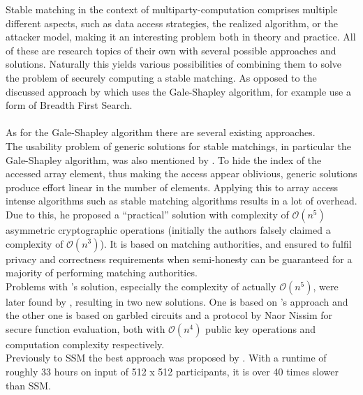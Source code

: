 Stable matching in the context of multiparty-computation comprises multiple different aspects, such as data access strategies, the realized algorithm, or the attacker model, making it an interesting problem both in theory and practice. All of these are research topics of their own with several possible approaches and solutions. Naturally this yields various possibilities of combining them to solve the problem of securely computing a stable matching. As opposed to the discussed approach by \citet{smas} which uses the Gale-Shapley algorithm, \citet{dogafscao} for example use a form of Breadth First Search.\\
\ \\As for the Gale-Shapley algorithm there are several existing approaches. 
\ \\The usability problem of generic solutions for stable matchings, in particular the Gale-Shapley algorithm, was also mentioned by \citet{apsma}. To hide the index of the accessed array element, thus making the access appear oblivious, generic solutions produce effort linear in the number of elements. Applying this to array access intense algorithms such as stable matching algorithms results in a lot of overhead. Due to this, he proposed a ``practical'' solution with complexity of $\mathcal{O}(n^5)$ asymmetric cryptographic operations (initially the authors falsely claimed a complexity of $\mathcal{O}(n^3)$). It is based on matching authorities, and ensured to fulfil privacy and correctness requirements when semi-honesty can be guaranteed for a majority of performing matching authorities. \\
Problems with \citeauthor{apsma}'s solution, especially the complexity of actually $\mathcal{O}(n^5)$, were later found by \citet{iefpsm}, resulting in two new solutions. One is based on \citeauthor{apsma}'s approach and the other one is based on garbled circuits and a protocol by Naor Nissim for secure function evaluation, both with $\mathcal{O}(n^4)$ public key operations and computation complexity respectively.\\
Previously to SSM the best approach was proposed by \citet{rsqo}. With a runtime of roughly 33 hours on input of 512 x 512 participants, it is over 40 times slower than SSM. 
